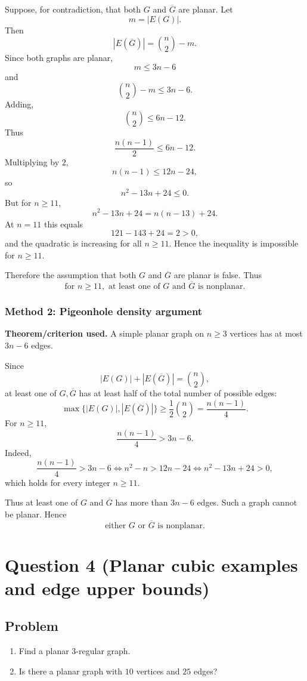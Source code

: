 \documentclass[12pt]{article}
\newcommand{\comp}[1]{\overline{#1}}
\begin{document}
Suppose, for contradiction, that both $G$ and $\comp{G}$ are planar. Let
\[
  m=|E(G)|.
\]
Then
\[
  |E(\comp{G})|=\binom{n}{2}-m.
\]
Since both graphs are planar,
\[
  m\le 3n-6
\]
and
\[
  \binom{n}{2}-m\le 3n-6.
\]
Adding,
\[
  \binom{n}{2}\le 6n-12.
\]
Thus
\[
  \frac{n(n-1)}{2}\le 6n-12.
\]
Multiplying by $2$,
\[
  n(n-1)\le 12n-24,
\]
so
\[
  n^2-13n+24\le 0.
\]
But for $n\ge 11$,
\[
  n^2-13n+24
  =n(n-13)+24.
\]
At $n=11$ this equals
\[
  121-143+24=2>0,
\]
and the quadratic is increasing for all $n\ge 11$. Hence the inequality is impossible for $n\ge 11$.

Therefore the assumption that both $G$ and $\comp{G}$ are planar is false. Thus
\[
  \boxed{\text{for }n\ge 11,\text{ at least one of }G\text{ and }\comp{G}\text{ is nonplanar}.}
\]

\subsubsection{Method 2: Pigeonhole density argument}
\textbf{Theorem/criterion used.} A simple planar graph on $n\ge 3$ vertices has at most $3n-6$ edges.

Since
\[
  |E(G)|+|E(\comp{G})|=\binom{n}{2},
\]
at least one of $G,\comp{G}$ has at least half of the total number of possible edges:
\[
  \max\{|E(G)|,|E(\comp{G})|\}\ge \frac{1}{2}\binom{n}{2}
  =\frac{n(n-1)}{4}.
\]
For $n\ge 11$,
\[
  \frac{n(n-1)}{4}>3n-6.
\]
Indeed,
\[
  \frac{n(n-1)}{4}>3n-6
  \iff
  n^2-n>12n-24
  \iff
  n^2-13n+24>0,
\]
which holds for every integer $n\ge 11$.

Thus at least one of $G$ and $\comp{G}$ has more than $3n-6$ edges. Such a graph cannot be planar. Hence
\[
  \boxed{\text{either }G\text{ or }\comp{G}\text{ is nonplanar}.}
\]

\newpage
\section{Question 4 (Planar cubic examples and edge upper bounds)}

\subsection{Problem}
\begin{enumerate}[label=(\alph*)]
  \item Find a planar $3$-regular graph.
  \item Is there a planar graph with $10$ vertices and $25$ edges?
\end{enumerate}
\end{document}
